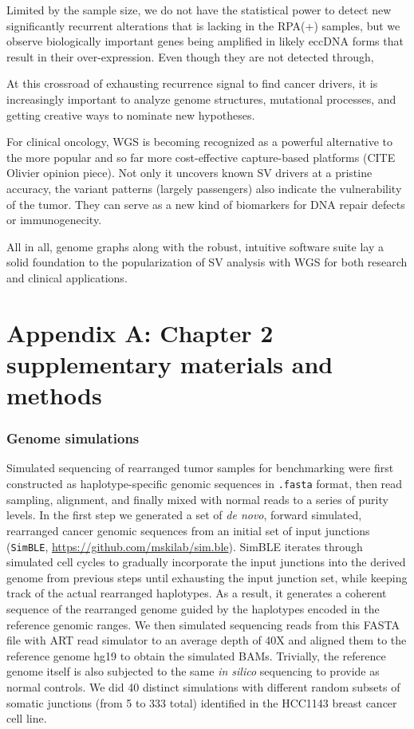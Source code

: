 \documentclass[phd,tocprelim]{cornell}
\newcommand{\ttt}[1]{\texttt{#1}}
\begin{document}
Limited by the sample size, we do not have the statistical power to detect new significantly recurrent alterations that is lacking in the RPA(+) samples, but we observe biologically important genes being amplified in likely eccDNA forms that result in their over-expression. Even though they are not detected through, 

At this crossroad of exhausting recurrence signal to find cancer drivers, it is increasingly important to analyze genome structures, mutational processes, and getting creative ways to nominate new hypotheses.

For clinical oncology, WGS is becoming recognized as a powerful alternative to the more popular and so far more cost-effective capture-based platforms (CITE Olivier opinion piece). Not only it uncovers known SV drivers at a pristine accuracy, the variant patterns (largely passengers) also indicate the vulnerability of the tumor. They can serve as a new kind of biomarkers for DNA repair defects or immunogenecity.

All in all, genome graphs along with the robust, intuitive software suite lay a solid foundation to the popularization of SV analysis with WGS for both research and clinical applications.

\appendix

\chapter*{Appendix A: Chapter 2 supplementary materials and methods} \label{app:a}
\subsection*{Genome simulations}
Simulated sequencing of rearranged tumor samples for benchmarking were first constructed as haplotype-specific genomic sequences in \ttt{.fasta} format, then read sampling, alignment, and finally mixed with normal reads to a series of purity levels. In the first step we generated a set of \textit{de novo}, forward simulated, rearranged cancer genomic sequences from an initial set of input junctions (\texttt{SimBLE}, \url{https://github.com/mskilab/sim.ble}). SimBLE iterates through simulated cell cycles to gradually incorporate the input junctions into the derived genome from previous steps until exhausting the input junction set, while keeping track of the actual rearranged haplotypes. As a result, it generates a coherent sequence of the rearranged genome guided by the haplotypes encoded in the reference genomic ranges. We then simulated sequencing reads from this FASTA file with ART read simulator \cite{Huang2012-zn} to an average depth of 40X and aligned them to the reference genome hg19 to obtain the simulated BAMs. Trivially, the reference genome itself is also subjected to the same \textit{in silico} sequencing to provide as normal controls. We did 40 distinct simulations with different random subsets of somatic junctions (from 5 to 333 total) identified in the HCC1143 breast cancer cell line. 
\end{document}
